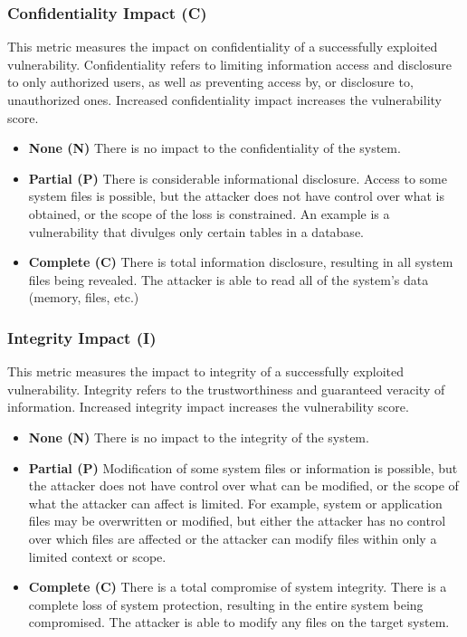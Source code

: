     \subsubsection{Confidentiality Impact
    (C)}\label{subsec:confidentiality-impact-c}

    This metric measures the impact on confidentiality of a successfully
    exploited vulnerability. Confidentiality refers to limiting information
    access and disclosure to only authorized users, as well as preventing
    access by, or disclosure to, unauthorized ones. Increased
    confidentiality impact increases the vulnerability score.

    \begin{itemize}
      \item
        \textbf{None (N)} There is no impact to the confidentiality of the
        system.
      \item
        \textbf{Partial (P)} There is considerable informational disclosure.
        Access to some system files is possible, but the attacker does not
        have control over what is obtained, or the scope of the loss is
        constrained. An example is a vulnerability that divulges only certain
        tables in a database.
      \item
        \textbf{Complete (C)} There is total information disclosure, resulting
        in all system files being revealed. The attacker is able to read all
        of the system's data (memory, files, etc.)
    \end{itemize}

    \subsubsection{Integrity Impact (I)}\label{subsec:integrity-impact-i}

    This metric measures the impact to integrity of a successfully exploited
    vulnerability. Integrity refers to the trustworthiness and guaranteed
    veracity of information. Increased integrity impact increases the
    vulnerability score.

    \begin{itemize}
      \item
        \textbf{None (N)} There is no impact to the integrity of the system.
      \item
        \textbf{Partial (P)} Modification of some system files or information
        is possible, but the attacker does not have control over what can be
        modified, or the scope of what the attacker can affect is limited. For
        example, system or application files may be overwritten or modified,
        but either the attacker has no control over which files are affected
        or the attacker can modify files within only a limited context or
        scope.
      \item
        \textbf{Complete (C)} There is a total compromise of system integrity.
        There is a complete loss of system protection, resulting in the entire
        system being compromised. The attacker is able to modify any files on
        the target system.
    \end{itemize}

